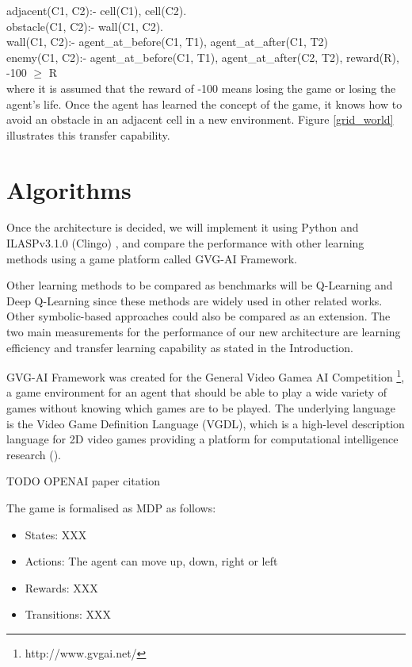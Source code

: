 adjacent(C1, C2):- cell(C1), cell(C2). \\
obstacle(C1, C2):- wall(C1, C2). \\
wall(C1, C2):- agent\_at\_before(C1, T1), agent\_at\_after(C1, T2) \\
enemy(C1, C2):- agent\_at\_before(C1, T1), agent\_at\_after(C2, T2), reward(R), -100 $\geq$ R \\

where it is assumed that the reward of -100 means losing the game or losing the agent's life. 
Once the agent has learned the concept of the game, it knows how to avoid an obstacle in an adjacent cell in a new environment. 
Figure \ref{grid_world} illustrates this transfer capability.

\section{Algorithms}
\label{algorithms}

Once the architecture is decided, we will implement it using Python and ILASPv3.1.0 (Clingo) \cite{Law2017}, and compare the performance with other learning methods using a game platform called GVG-AI Framework.

Other learning methods to be compared as benchmarks will be Q-Learning and Deep Q-Learning since these methods are widely used in other related works. 
Other symbolic-based approaches could also be compared as an extension. 
The two main measurements for the performance of our new architecture are learning efficiency and transfer learning capability as stated in the Introduction.

GVG-AI Framework was created for the General Video Gamea AI Competition \footnote{http://www.gvgai.net/}, 
a game environment for an agent that should be able to play a wide variety of games without knowing which games are to be played.
The underlying language is the Video Game Definition Language (VGDL), which is a high-level description language for 2D video games providing a platform for computational intelligence research (\cite{Schaul2013}).

TODO OPENAI paper citation

The game is formalised as MDP as follows:

\begin{itemize}

\item States: XXX
\item Actions: The agent can move up, down, right or left
\item Rewards: XXX
\item Transitions: XXX

\end{itemize}


